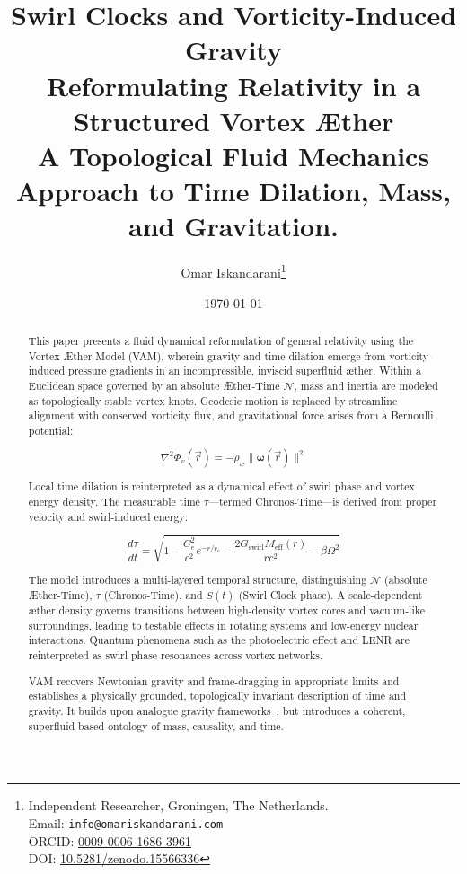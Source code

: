 \documentclass[a4paper,12pt]{article}
\title{Swirl Clocks and Vorticity-Induced Gravity\\  Reformulating Relativity in a Structured Vortex Æther\\  A Topological Fluid Mechanics Approach to Time Dilation, Mass, and Gravitation. }
\author{
    Omar Iskandarani\thanks{
        Independent Researcher, Groningen, The Netherlands.\\
        Email: \texttt{info@omariskandarani.com}\\
        ORCID: \href{https://orcid.org/0009-0006-1686-3961}{0009-0006-1686-3961}\\
        DOI: \href{https://doi.org/10.5281/zenodo.15566336}{10.5281/zenodo.15566336}
    }
}
\date{\today}
\begin{document}
    \maketitle


    \begin{abstract}
        This paper presents a fluid dynamical reformulation of general relativity using the Vortex Æther Model (VAM), wherein gravity and time dilation emerge from vorticity-induced pressure gradients in an incompressible, inviscid superfluid æther. Within a Euclidean space governed by an absolute Æther-Time $\mathcal{N}$, mass and inertia are modeled as topologically stable vortex knots. Geodesic motion is replaced by streamline alignment with conserved vorticity flux, and gravitational force arises from a Bernoulli potential:

        \begin{equation*}
            \nabla^2 \Phi_v(\vec{r}) = -\rho_\text{\ae} \|\boldsymbol{\omega}(\vec{r})\|^2
        \end{equation*}

        Local time dilation is reinterpreted as a dynamical effect of swirl phase and vortex energy density. The measurable time $\tau$—termed Chronos-Time—is derived from proper velocity and swirl-induced energy:

        \begin{equation*}
            \frac{d\tau}{dt} = \sqrt{1 - \frac{C_e^2}{c^2} e^{-r/r_c} - \frac{2G_\text{swirl} M_\text{eff}(r)}{rc^2} - \beta \Omega^2}
        \end{equation*}

        The model introduces a multi-layered temporal structure, distinguishing $\mathcal{N}$ (absolute Æther-Time), $\tau$ (Chronos-Time), and $S(t)$ (Swirl Clock phase). A scale-dependent æther density governs transitions between high-density vortex cores and vacuum-like surroundings, leading to testable effects in rotating systems and low-energy nuclear interactions. Quantum phenomena such as the photoelectric effect and LENR are reinterpreted as swirl phase resonances across vortex networks.

        VAM recovers Newtonian gravity and frame-dragging in appropriate limits and establishes a physically grounded, topologically invariant description of time and gravity. It builds upon analogue gravity frameworks~\cite{barcelo2011analogue,volovik2009universe}, but introduces a coherent, superfluid-based ontology of mass, causality, and time.
    \end{abstract}
\end{document}

